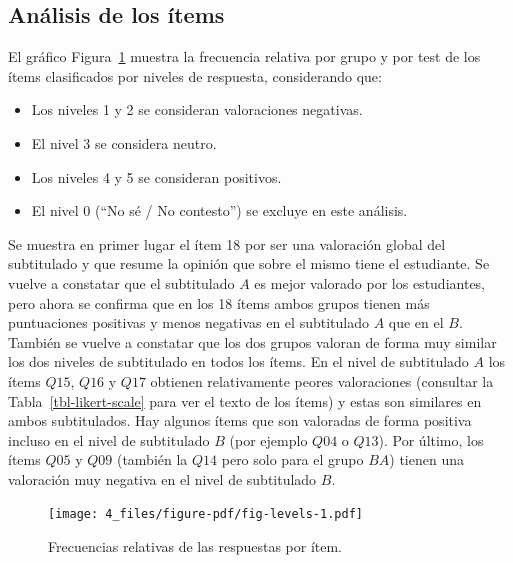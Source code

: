 \documentclass[
  12pt,
  a4paper,
  extrafontsizes,
  onecolumn,
  openright,
  table]{memoir}
\providecommand{\tightlist}{%
  \setlength{\itemsep}{0pt}\setlength{\parskip}{0pt}}\usepackage{longtable,booktabs,array}
\begin{document}
\hypertarget{anuxe1lisis-de-los-uxedtems}{%
\subsection{Análisis de los ítems}\label{anuxe1lisis-de-los-uxedtems}}

El gráfico Figura~\ref{fig-levels} muestra la frecuencia relativa por
grupo y por test de los ítems clasificados por niveles de respuesta,
considerando que:

\begin{itemize}
\tightlist
\item
  Los niveles 1 y 2 se consideran valoraciones negativas.
\item
  El nivel 3 se considera neutro.
\item
  Los niveles 4 y 5 se consideran positivos.
\item
  El nivel 0 (\enquote{No sé / No contesto}) se excluye en este
  análisis.
\end{itemize}

Se muestra en primer lugar el ítem 18 por ser una valoración global del
subtitulado y que resume la opinión que sobre el mismo tiene el
estudiante. Se vuelve a constatar que el subtitulado \(A\) es mejor
valorado por los estudiantes, pero ahora se confirma que en los 18 ítems
ambos grupos tienen más puntuaciones positivas y menos negativas en el
subtitulado \(A\) que en el \(B\). También se vuelve a constatar que los
dos grupos valoran de forma muy similar los dos niveles de subtitulado
en todos los ítems. En el nivel de subtitulado \(A\) los ítems \(Q15\),
\(Q16\) y \(Q17\) obtienen relativamente peores valoraciones (consultar
la Tabla~\ref{tbl-likert-scale} para ver el texto de los ítems) y estas
son similares en ambos subtitulados. Hay algunos ítems que son valoradas
de forma positiva incluso en el nivel de subtitulado \(B\) (por ejemplo
\(Q04\) o \(Q13\)). Por último, los ítems \(Q05\) y \(Q09\) (también la
\(Q14\) pero solo para el grupo \(BA\)) tienen una valoración muy
negativa en el nivel de subtitulado \(B\).

\begin{figure}[h]

{\centering \texttt{[image: 4\_files/figure-pdf/fig-levels-1.pdf]}

}

\caption{\label{fig-levels}Frecuencias relativas de las respuestas por
ítem.}

\end{figure}
\end{document}

